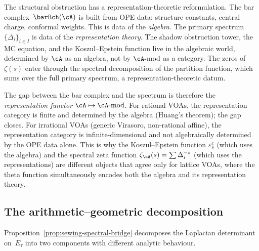 \begin{remark}%
\label{rem:algebra-representation-gap}%
%
%
%
The structural obstruction has a representation-theoretic
reformulation.
The bar complex~$\barBch(\cA)$ is built from OPE
data: structure constants, central charge,
conformal weights. This is data of the
\emph{algebra}. The primary spectrum
$\{\Delta_i\}_{i \in I}$ is data of the
\emph{representation theory}. The shadow obstruction tower, the
MC equation, and the Koszul--Epstein function live in the
algebraic world, determined by $\cA$ as an algebra, not
by $\cA\text{-}\mathrm{mod}$ as a category. The zeros
of~$\zeta(s)$ enter through the spectral decomposition of the
partition function, which sums over the full primary
spectrum, a representation-theoretic datum.

The gap between the bar complex and the spectrum is therefore
the \emph{representation functor}
$\cA \mapsto \cA\text{-}\mathrm{mod}$. For rational VOAs,
the representation category is finite and determined by the
algebra (Huang's theorem); the gap closes. For irrational VOAs
(generic Virasoro, non-rational affine), the representation
category is infinite-dimensional and not algebraically determined
by the OPE data alone. This is why the Koszul--Epstein function
$\varepsilon^c_s$ (which uses the algebra) and the spectral zeta
function $\zeta_\cA(s) = \sum \Delta_i^{-s}$ (which uses the
representations) are different objects that agree only for
lattice VOAs, where the theta function simultaneously encodes
both the algebra and its representation theory.
\end{remark}

\subsection{The arithmetic--geometric decomposition}%
\label{subsec:arithmetic-geometric-decomposition}%

Proposition~\ref{prop:sewing-spectral-bridge} decomposes the
Laplacian determinant on~$E_\tau$ into two components with
different analytic behaviour.

